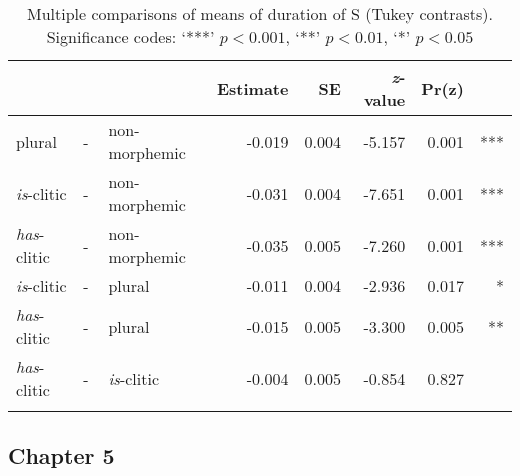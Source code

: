 \begin{table}[H]\fontsize{10}{11}
\caption{Multiple comparisons of means of duration of S (Tukey contrasts). Significance codes: `***' $p < 0.001$, `**' $p < 0.01$, `*' $p < 0.05$}
\label{tab:4.11}
\centering
\begin{tabular}{lllrrrrr} 
\lsptoprule
~                   & ~ & ~                  & Estimate & SE    & \textit{z}-value & Pr(\textbar{}z\textbar{}) & ~    \\ 
\midrule
plural              & - & non-morphemic      & -0.019   & 0.004 & -5.157           & 
  0.001                  & ***  \\
\textit{is}-clitic  & - & non-morphemic      & -0.031   & 0.004 & -7.651           &  0.001                    & ***  \\
\textit{has}-clitic & - & non-morphemic      & -0.035   & 0.005 & -7.260           & 
  0.001                  & ***  \\
\textit{is}-clitic  & - & plural             & -0.011   & 0.004 & -2.936           & 0.017                     & *    \\
\textit{has}-clitic & - & plural             & -0.015   & 0.005 & -3.300           & 0.005                     & **   \\
\textit{has}-clitic & - & \textit{is}-clitic & -0.004   & 0.005 & -0.854           & 0.827                     & ~    \\
\lspbottomrule
\end{tabular}
\end{table}


\subsection{Chapter 5}


